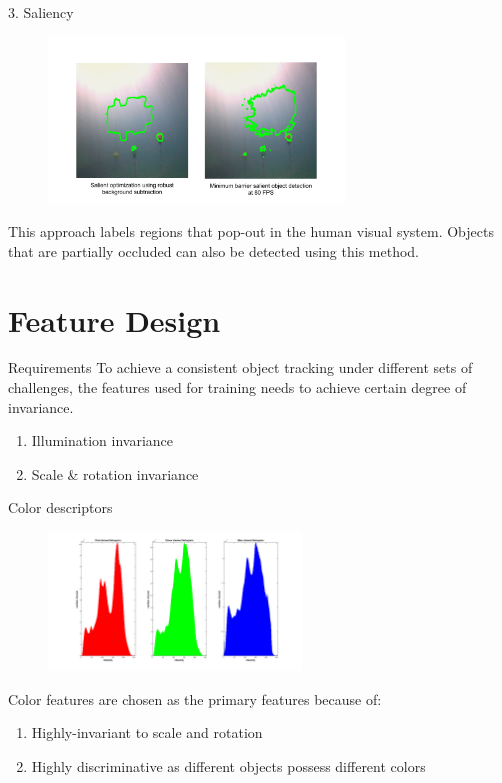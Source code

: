 \documentclass[13pt]{beamer}
\begin{document}
\begin{frame}{3. Saliency}

  \begin{figure}[ht]
      \centering
      \includegraphics[width=0.7\textwidth, height=0.4\textwidth]{figs/saliency.png}
  \end{figure}

  This approach labels regions that pop-out in the human visual system. Objects
  that are partially occluded can also be detected using this method.
\end{frame}

\section{Feature Design}

\begin{frame}{Requirements}
  To achieve a consistent object tracking under different sets of challenges,
  the features used for training needs to achieve certain degree of invariance.
  \begin{enumerate}
    \item Illumination invariance
    \item Scale \& rotation invariance
  \end{enumerate}
\end{frame}

\begin{frame}{Color descriptors}

  \begin{figure}[ht]
      \centering
      \includegraphics[width=0.6\textwidth, height=0.3\textwidth]{figs/colorhistogram.png}
  \end{figure}

  Color features are chosen as the primary features because of:
  \begin{enumerate}
    \item Highly-invariant to scale and rotation
    \item Highly discriminative as different objects possess different colors
  \end{enumerate}

\end{frame}
\end{document}

